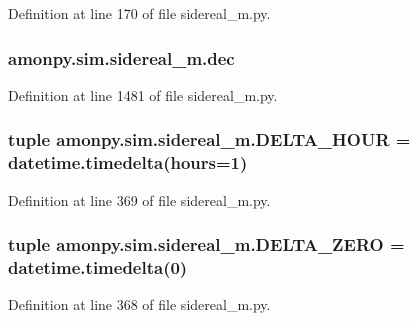 Definition at line 170 of file sidereal\-\_\-m.\-py.

\hypertarget{namespaceamonpy_1_1sim_1_1sidereal__m_aee6dccac434aa3a594b8821470a6ee7b}{
\subsubsection[{dec}]{\setlength{\rightskip}{0pt plus 5cm}amonpy.\-sim.\-sidereal\-\_\-m.\-dec}}\label{namespaceamonpy_1_1sim_1_1sidereal__m_aee6dccac434aa3a594b8821470a6ee7b}


Definition at line 1481 of file sidereal\-\_\-m.\-py.

\hypertarget{namespaceamonpy_1_1sim_1_1sidereal__m_ae6efe7e6fac4c0f8c11b6fbf33a1bad9}{
\subsubsection[{D\-E\-L\-T\-A\-\_\-\-H\-O\-U\-R}]{\setlength{\rightskip}{0pt plus 5cm}tuple amonpy.\-sim.\-sidereal\-\_\-m.\-D\-E\-L\-T\-A\-\_\-\-H\-O\-U\-R = datetime.\-timedelta({\bf hours}=1)}}\label{namespaceamonpy_1_1sim_1_1sidereal__m_ae6efe7e6fac4c0f8c11b6fbf33a1bad9}


Definition at line 369 of file sidereal\-\_\-m.\-py.

\hypertarget{namespaceamonpy_1_1sim_1_1sidereal__m_af468502357aec95173ae54130971484b}{
\subsubsection[{D\-E\-L\-T\-A\-\_\-\-Z\-E\-R\-O}]{\setlength{\rightskip}{0pt plus 5cm}tuple amonpy.\-sim.\-sidereal\-\_\-m.\-D\-E\-L\-T\-A\-\_\-\-Z\-E\-R\-O = datetime.\-timedelta(0)}}\label{namespaceamonpy_1_1sim_1_1sidereal__m_af468502357aec95173ae54130971484b}


Definition at line 368 of file sidereal\-\_\-m.\-py.

